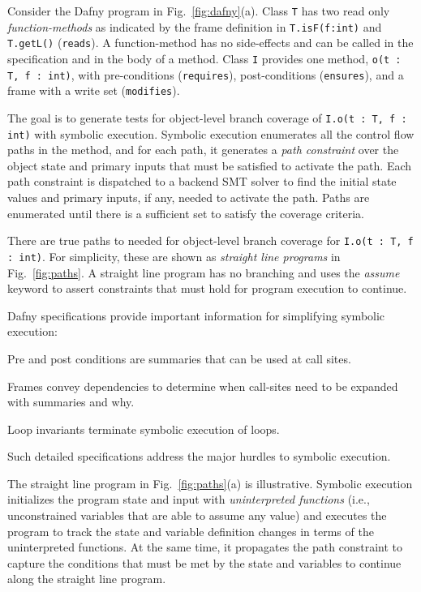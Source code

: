 \documentclass[11pt,onecolumn,notitlepage]{article}
\newcommand{\figref}[1]{Fig.~\ref{#1}}
\begin{document}
Consider the Dafny program in \figref{fig:dafny}(a). Class \texttt{T} has two read only \emph{function-methods} as indicated by the frame definition in \texttt{T.isF(f:int)} and \texttt{T.getL()} (\texttt{reads}). A function-method has no side-effects and can be called in the specification and in the body of a method. Class \texttt{I} provides one method, \texttt{o(t : T, f : int)}, with pre-conditions (\texttt{requires}), post-conditions (\texttt{ensures}), and a frame with a write set (\texttt{modifies}).

The goal is to generate tests for object-level branch coverage of \texttt{I.o(t : T, f : int)} with symbolic execution. Symbolic execution enumerates all the control flow paths in the method, and for each path, it generates a \emph{path constraint} over the object state and primary inputs that must be satisfied to activate the path. Each path constraint is dispatched to a backend SMT solver to find the initial state values and primary inputs, if any, needed to activate the path. Paths are enumerated until there is a sufficient set to satisfy the coverage criteria.

There are true paths to needed for object-level branch coverage for \texttt{I.o(t : T, f : int)}. For simplicity, these are shown as \emph{straight line programs} in \figref{fig:paths}. A straight line program has no branching and uses the \emph{assume} keyword to assert constraints that must hold for program execution to continue. 

Dafny specifications provide important information for simplifying symbolic execution:
\begin{compactitem}
  \item Pre and post conditions are summaries that can be used at call sites.
  \item Frames convey dependencies to determine when call-sites need to be expanded with summaries and why.
  \item Loop invariants terminate symbolic execution of loops.
\end{compactitem}
Such detailed specifications address the major hurdles to symbolic execution.

The straight line program in \figref{fig:paths}(a) is illustrative. Symbolic execution initializes the program state and input with \emph{uninterpreted functions} (i.e., unconstrained variables that are able to assume any value) and executes the program to track the state and variable definition changes in terms of the uninterpreted functions. At the same time, it propagates the path constraint to capture the conditions that must be met by the state and variables to continue along the straight line program.
\end{document}
